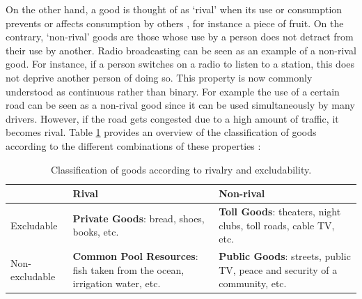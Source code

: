 On the other hand, a good is thought of as `rival' when its use or consumption prevents or affects consumption by others \parencite{weimer2005policy}, for instance a piece of fruit. On the contrary, `non-rival' goods are those whose use by a person does not detract from their use by another. Radio broadcasting can be seen as an example of a non-rival good. For instance, if a person switches on a radio to listen to a station, this does not deprive another person of doing so. This property is now commonly understood as continuous rather than binary. For example the use of a certain road can be seen as a non-rival good since it can be used simultaneously by many drivers. However, if the road gets congested due to a high amount of traffic, it becomes rival. Table \ref{table:types-of-goods} provides an overview of the classification of goods according to the different combinations of these properties \parencite{ostrom1999public}:

\begin{center}
\begin{table}[h!]
\begin{tabular}{ l || p{5cm} | p{5cm} }
   & Rival & Non-rival \\
  \hline  \hline 
  Excludable & \textbf{Private Goods}: bread, shoes, books, etc. & \textbf{Toll Goods}: theaters, night clubs, toll roads, cable TV, etc. \\
  \hline  
  Non-excludable & \textbf{Common Pool Resources}: fish taken from the ocean, irrigation water, etc.  & \textbf{Public Goods}: streets, public TV, peace and security of a community, etc. \\
\end{tabular}
\caption[Classification of goods according to rivalry and excludability]{Classification of goods according to rivalry and excludability.}
\label{table:types-of-goods}
 \end{table}  
\end{center}

